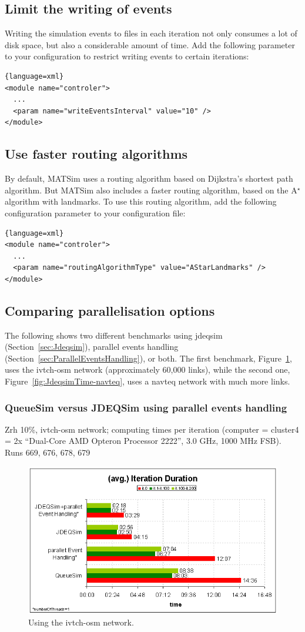 \subsection{Limit the writing of events}
Writing the simulation events to files in each iteration not only consumes a lot of disk space, but also a considerable amount of time. Add the following parameter to your configuration to restrict writing events to certain iterations:
\begin{lstlisting}{language=xml}
<module name="controler">
  ...
  <param name="writeEventsInterval" value="10" />
</module>
\end{lstlisting}

\subsection{Use faster routing algorithms}
By default, MATSim uses a routing algorithm based on Dijkstra's shortest path algorithm. But MATSim also includes a faster routing algorithm, based on the A$^{\star}$ algorithm with landmarks. To use this routing algorithm, add the following configuration parameter to your configuration file:
\begin{lstlisting}{language=xml}
<module name="controler">
  ...
  <param name="routingAlgorithmType" value="AStarLandmarks" />
</module>
\end{lstlisting}

\subsection{Comparing parallelisation options}
The following shows two different benchmarks using jdeqsim (Section~\ref{sec:Jdeqsim}), parallel events handling (Section~\ref{sec:ParallelEventsHandling}), or both. The first benchmark, Figure~\ref{fig:JdeqsimTime}, uses the ivtch-osm network (approximately 60,000 links), while the second one, Figure~\ref{fig:JdeqsimTime-navteq}, uses a navteq network with much more links.

\subsubsection{QueueSim versus JDEQSim using parallel events handling}
Zrh 10\%, ivtch-osm network; computing times per iteration (computer = cluster4 = 2x ``Dual-Core AMD Opteron Processor 2222'', 3.0 GHz, 1000 MHz FSB).  Runs 669, 676, 678, 679
\begin{figure}[h]
\centering
\includegraphics[width=0.75\linewidth]{figures/benchmarks/jdeqsimtime}
\caption{Using the ivtch-osm network.}
\label{fig:JdeqsimTime}
\end{figure}

